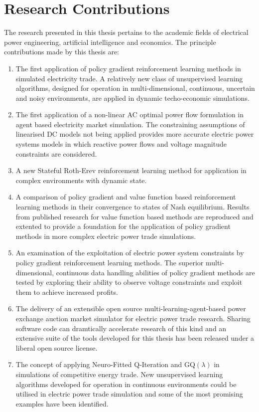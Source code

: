 \section{Research Contributions}
The research presented in this thesis pertains to the academic fields of
electrical power engineering, artificial intelligence and economics.  The
principle contributions made by this thesis are:
\begin{enumerate}
  \item The first application of policy gradient reinforcement learning
  methods in simulated electricity trade. A relatively new class of
  unsupervised learning algorithms, designed for operation in multi-dimensional,
  continuous, uncertain and noisy environments, are applied in dynamic
  techo-economic simulations.
  \item The first application of a non-linear AC optimal power flow formulation
  in agent based electricity market simulation. The constraining assumptions of
  linearised DC models not being applied provides more accurate electric power
  systems models in which reactive power flows and voltage magnitude constraints
  are considered.
  \item A new Stateful Roth-Erev reinforcement learning method for application
  in complex environments with dynamic state.
  \item A comparison of policy gradient and value function based reinforcement
  learning methods in their convergence to states of Nash equilibrium. Results
  from published research for value function based methods are reproduced and
  extented to provide a foundation for the application of policy gradient
  methods in more complex electric power trade simulations.
  \item An examination of the exploitation of electric power system constraints
  by policy gradient reinforcement learning methods.  The
  superior multi-dimensional, continuous data handling abilities of policy
  gradient methods are tested by exploring their ability to observe voltage
  constraints and exploit them to achieve increased profits.
  \item The delivery of an extensible open source multi-learning-agent-based
  power exchange auction market simulator for electric power trade research.
  Sharing software code can dramtically accelerate research of this kind and an
  extensive suite of the tools developed for this thesis has been released
  under a liberal open source license.
  \item The concept of applying Neuro-Fitted Q-Iteration and GQ$(\lambda)$ in
  simulations of competitive energy trade. New unsupervised learning algorithms
  developed for operation in continuous environments could be utilised in
  electric power trade simulation and some of the most promising examples have
  been identified.
\end{enumerate}
